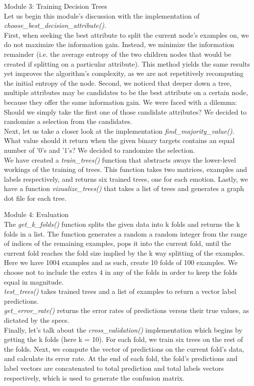 Module 3: Training Decision Trees \\
Let us begin this module's discussion with the implementation of \emph{choose\_best\_decision\_attribute()}. \\
First, when seeking the best attribute to split the current node's examples on, we do not maximize the information gain.
Instead, we minimize the information remainder (i.e. the average entropy of the two children nodes
that would be created if splitting on a particular attribute).
This method yields the same results yet improves the algorithm's complexity,
as we are not repetitively recomputing the initial entropy of the node.
Second, we noticed that deeper down a tree, multiple attributes may be candidates to be the best attribute on a certain node,
because they offer the same information gain. We were faced with a dilemma: Should we simply
take the first one of those candidate attributes? We decided to randomize a selection from the candidates.\\
Next, let us take a closer look at the implementation \emph{find\_majority\_value()}.\\
What value should it return when the given binary targets contains an equal number of
'0's and '1's? We decided to randomize the selection.\\
We have created a \emph{train\_trees()} function that abstracts aways the lower-level workings of the training
of trees. This function takes two matrices, examples and labels respectively,
and returns six trained trees, one for each emotion.
Lastly, we have a function \emph{vizualize\_trees()} that takes a list of trees and generates a graph dot file
for each tree.

Module 4: Evaluation \\
The \emph{get\_k\_folds()} function splits the given data into k folds and returns the k folds in a list.
The function generates a random a random integer from the range of indices
of the remaining examples, pops it into the current fold, until the current fold reaches the fold size implied
by the k way splitting of the examples. Here we have 1004 examples and as such, create 10 folds of 100 examples.
We choose not to include the extra 4 in any of the folds in order to keep the folds equal in magnitude.\\
\emph{test\_trees()} takes trained trees and a list of examples to return a vector label predictions.\\
\emph{get\_error\_rate()} returns the error rates of predictions versus their true values, as dictated by the specs.\\
Finally, let's talk about the \emph{cross\_validation()} implementation which begins by getting the k folds (here k = 10).
For each fold, we train six trees on the rest of the folds. Next, we compute the vector of predictions on the current fold's data,
and calculate its error rate. At the end of each fold, the fold's predictions and label vectors are concatenated to total prediction and
total labels vectors respectively, which is used to generate the confusion matrix.
